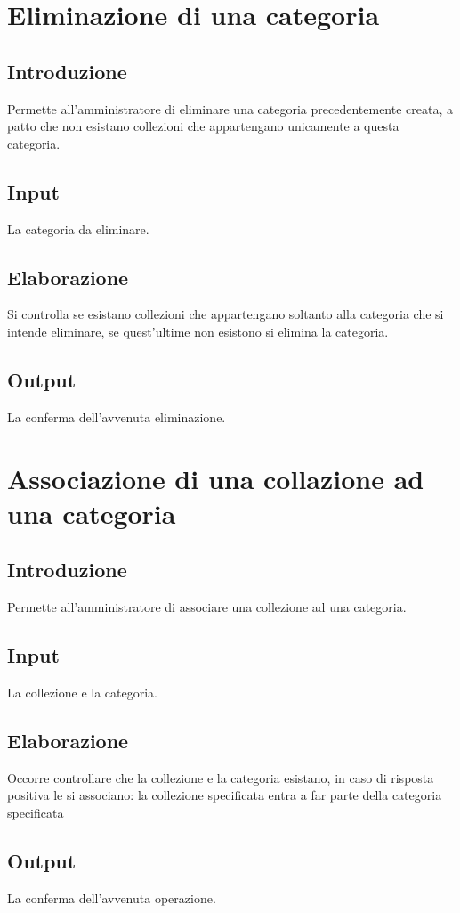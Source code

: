 \documentclass{scrreprt}
\begin{document}
\section{Eliminazione di una categoria}

\subsection*{Introduzione}
Permette all'amministratore di eliminare una categoria precedentemente creata, a patto che non esistano
collezioni che appartengano unicamente a questa categoria.
\subsection*{Input}
La categoria da eliminare.
\subsection*{Elaborazione}
Si controlla se esistano collezioni che appartengano soltanto alla categoria che si intende eliminare, se quest'ultime
non esistono si elimina la categoria.
\subsection*{Output}
La conferma dell'avvenuta eliminazione.

\section{Associazione di una collazione ad una categoria}

\subsection*{Introduzione}
Permette all'amministratore di associare una collezione ad una categoria.
\subsection*{Input}
La collezione e la categoria.
\subsection*{Elaborazione}
Occorre controllare che la collezione e la categoria esistano, in caso di risposta positiva le si associano: la
collezione specificata entra a far parte della categoria specificata
\subsection*{Output}
La conferma dell'avvenuta operazione.
\end{document}
